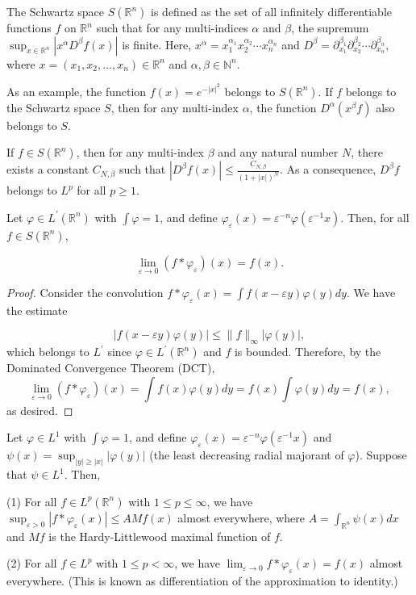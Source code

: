\begin{definition}
    The Schwartz space $S(\mathbb{R}^n)$ is defined as the set of all infinitely differentiable functions $f$ on $\mathbb{R}^n$ such that for any multi-indices $\alpha$ and $\beta$, the supremum
$\sup_{x \in \mathbb{R}^n} |x^\alpha D^\beta f(x)|$
is finite. Here, $x^\alpha = x_1^{\alpha_1} x_2^{\alpha_2} \cdots x_n^{\alpha_n}$ and $D^\beta = \partial_{x_1}^{\beta_1} \partial_{x_2}^{\beta_2} \cdots \partial_{x_n}^{\beta_n}$, where $x = (x_1, x_2, \ldots, x_n) \in \mathbb{R}^n$ and $\alpha, \beta \in \mathbb{N}^n$.
\end{definition}
As an example, the function $f(x) = e^{-|x|^2}$ belongs to $S(\mathbb{R}^n)$.
If $f$ belongs to the Schwartz space $S$, then for any multi-index $\alpha$, the function $D^\alpha(x^\beta f)$ also belongs to $S$.
\begin{proposition}
    If $f \in S(\mathbb{R}^n)$, then for any multi-index $\beta$ and any natural number $N$, there exists a constant $C_{N, \beta}$ such that
$|D^\beta f(x)| \leqslant \frac{C_{N, \beta}}{(1 + |x|)^N}.$
As a consequence, $D^\beta f$ belongs to $L^p$ for all $p \geqslant 1$.
\end{proposition}
\begin{proposition}
Let $\varphi \in L^{\prime}\left(\mathbb{R}^n\right)$ with $\int \varphi = 1$, and define $\varphi_{\varepsilon}(x) = \varepsilon^{-n} \varphi\left(\varepsilon^{-1} x\right)$. Then, for all $f \in S\left(\mathbb{R}^n\right)$,

$$\lim_{\varepsilon \rightarrow 0} (f * \varphi_{\varepsilon})(x) = f(x).$$
\end{proposition}
\begin{proof}
     Consider the convolution $f * \varphi_{\varepsilon}(x) = \int f(x - \varepsilon y) \varphi(y) dy$. We have the estimate

$$|f(x - \varepsilon y) \varphi(y)| \leqslant \|f\|_{\infty}|\varphi(y)|,$$
which belongs to $L^{\prime}$ since $\varphi \in L^{\prime}\left(\mathbb{R}^n\right)$ and $f$ is bounded. Therefore, by the Dominated Convergence Theorem (DCT),
$$\lim_{\varepsilon \rightarrow 0} (f * \varphi_{\varepsilon})(x) = \int f(x) \varphi(y) dy = f(x) \int \varphi(y) dy = f(x),$$
as desired.
\end{proof}
\begin{theorem}
    Let $\varphi \in L^{1}$ with $\int \varphi=1$, and define $\varphi_{\varepsilon}(x)=\varepsilon^{-n} \varphi(\varepsilon^{-1} x)$ and $\psi(x)=\sup _{|y| \geqslant|x|}|\varphi(y)|$ (the least decreasing radial majorant of $\varphi$). Suppose that $\psi \in L^{1}$. Then,

(1) For all $f \in L^p(\mathbb{R}^n)$ with $1 \leqslant p \leqslant \infty$, we have $\sup_{\varepsilon>0}|f * \varphi_{\varepsilon}(x)| \leqslant A Mf(x)$ almost everywhere, where $A=\int_{\mathbb{R}^n} \psi(x) dx$ and $Mf$ is the Hardy-Littlewood maximal function of $f$.

(2) For all $f \in L^p$ with $1 \leqslant p < \infty$, we have $\lim_{\varepsilon \rightarrow 0} f * \varphi_{\varepsilon}(x)=f(x)$ almost everywhere. (This is known as differentiation of the approximation to identity.)
\end{theorem}
